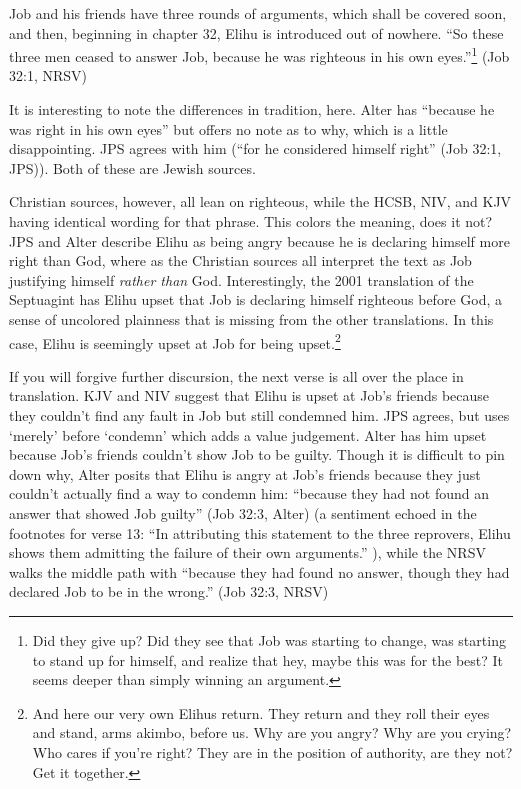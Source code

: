 Job and his friends have three rounds of arguments, which shall be covered soon, and then, beginning in chapter 32, Elihu is introduced out of nowhere. ``So these three men ceased to answer Job, because he was righteous in his own eyes.''\footnote{Did they give up? Did they see that Job was starting to change, was starting to stand up for himself, and realize that hey, maybe this was for the best? It seems deeper than simply winning an argument.} (Job 32:1, NRSV)

It is interesting to note the differences in tradition, here. Alter has ``because he was right in his own eyes'' but offers no note as to why, which is a little disappointing. JPS agrees with him (``for he considered himself right'' (Job 32:1, JPS)). Both of these are Jewish sources.

Christian sources, however, all lean on righteous, while the HCSB, NIV, and KJV having identical wording for that phrase. This colors the meaning, does it not? JPS and Alter describe Elihu as being angry because he is declaring himself more right than God, where as the Christian sources all interpret the text as Job justifying himself \emph{rather than} God. Interestingly, the 2001 translation of the Septuagint has Elihu upset that Job is declaring himself righteous before God, a sense of uncolored plainness that is missing from the other translations. In this case, Elihu is seemingly upset at Job for being upset.\footnote{And here our very own Elihus return. They return and they roll their eyes and stand, arms akimbo, before us. Why are you angry? Why are you crying? Who cares if you're right? They are in the position of authority, are they not? Get it together.}

If you will forgive further discursion, the next verse is all over the place in translation. KJV and NIV suggest that Elihu is upset at Job's friends because they couldn't find any fault in Job but still condemned him. JPS agrees, but uses `merely' before `condemn' which adds a value judgement. Alter has him upset because Job's friends couldn't show Job to be guilty. Though it is difficult to pin down why, Alter posits that Elihu is angry at Job's friends because they just couldn't actually find a way to condemn him: ``because they had not found an answer that showed Job guilty'' (Job 32:3, Alter) (a sentiment echoed in the footnotes for verse 13: ``In attributing this statement to the three reprovers, Elihu shows them admitting the failure of their own arguments.'' \parencite[548]{alter}), while the NRSV walks the middle path with ``because they had found no answer, though they had declared Job to be in the wrong.'' (Job 32:3, NRSV)

